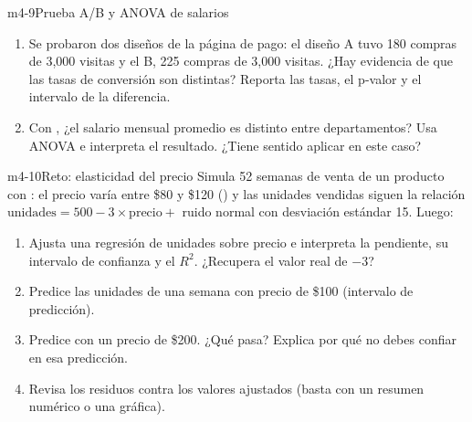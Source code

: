 \begin{ejercicio}{m4-9}{Prueba A/B y ANOVA de salarios}
\begin{enumerate}
  \item Se probaron dos diseños de la página de pago: el diseño A tuvo 180
        compras de 3,000 visitas y el B, 225 compras de 3,000 visitas.
        ¿Hay evidencia de que las tasas de conversión son distintas? Reporta
        las tasas, el p-valor y el intervalo de la diferencia.
  \item Con , ¿el salario mensual promedio es
        distinto entre departamentos? Usa ANOVA e interpreta el resultado.
        ¿Tiene sentido aplicar  en este caso?
\end{enumerate}
\end{ejercicio}

\begin{ejercicio}{m4-10}{Reto: elasticidad del precio}
Simula 52 semanas de venta de un producto con : el
precio varía entre \$80 y \$120 () y las unidades vendidas
siguen la relación $\text{unidades} = 500 - 3 \times \text{precio} +$ ruido
normal con desviación estándar 15. Luego:
\begin{enumerate}
  \item Ajusta una regresión de unidades sobre precio e interpreta la
        pendiente, su intervalo de confianza y el $R^2$. ¿Recupera el valor
        real de $-3$?
  \item Predice las unidades de una semana con precio de \$100 (intervalo de
        predicción).
  \item Predice con un precio de \$200. ¿Qué pasa? Explica por qué no debes
        confiar en esa predicción.
  \item Revisa los residuos contra los valores ajustados (basta con un
        resumen numérico o una gráfica).
\end{enumerate}
\end{ejercicio}
